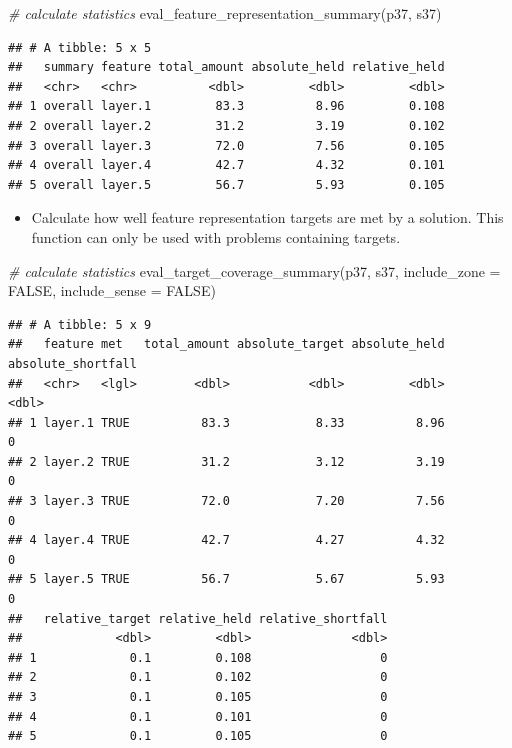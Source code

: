 \documentclass[
  12pt,
]{book}
\newenvironment{Shaded}{\begin{snugshade}}{\end{snugshade}}
\newcommand{\AttributeTok}[1]{\textcolor[rgb]{0.77,0.63,0.00}{#1}}
\newcommand{\CommentTok}[1]{\textcolor[rgb]{0.56,0.35,0.01}{\textit{#1}}}
\newcommand{\ConstantTok}[1]{\textcolor[rgb]{0.00,0.00,0.00}{#1}}
\newcommand{\FunctionTok}[1]{\textcolor[rgb]{0.00,0.00,0.00}{#1}}
\newcommand{\NormalTok}[1]{#1}
\providecommand{\tightlist}{%
  \setlength{\itemsep}{0pt}\setlength{\parskip}{0pt}}
\begin{document}
\begin{Shaded}
\begin{Highlighting}[]
\CommentTok{\# calculate statistics}
\FunctionTok{eval\_feature\_representation\_summary}\NormalTok{(p37, s37)}
\end{Highlighting}
\end{Shaded}

\begin{verbatim}
## # A tibble: 5 x 5
##   summary feature total_amount absolute_held relative_held
##   <chr>   <chr>          <dbl>         <dbl>         <dbl>
## 1 overall layer.1         83.3          8.96         0.108
## 2 overall layer.2         31.2          3.19         0.102
## 3 overall layer.3         72.0          7.56         0.105
## 4 overall layer.4         42.7          4.32         0.101
## 5 overall layer.5         56.7          5.93         0.105
\end{verbatim}

\begin{itemize}
\tightlist
\item
  Calculate how well feature representation targets are met by a solution. This function can only be used with problems containing targets.
\end{itemize}

\begin{Shaded}
\begin{Highlighting}[]
\CommentTok{\# calculate statistics}
\FunctionTok{eval\_target\_coverage\_summary}\NormalTok{(p37, s37, }\AttributeTok{include\_zone =} \ConstantTok{FALSE}\NormalTok{, }\AttributeTok{include\_sense =} \ConstantTok{FALSE}\NormalTok{)}
\end{Highlighting}
\end{Shaded}

\begin{verbatim}
## # A tibble: 5 x 9
##   feature met   total_amount absolute_target absolute_held absolute_shortfall
##   <chr>   <lgl>        <dbl>           <dbl>         <dbl>              <dbl>
## 1 layer.1 TRUE          83.3            8.33          8.96                  0
## 2 layer.2 TRUE          31.2            3.12          3.19                  0
## 3 layer.3 TRUE          72.0            7.20          7.56                  0
## 4 layer.4 TRUE          42.7            4.27          4.32                  0
## 5 layer.5 TRUE          56.7            5.67          5.93                  0
##   relative_target relative_held relative_shortfall
##             <dbl>         <dbl>              <dbl>
## 1             0.1         0.108                  0
## 2             0.1         0.102                  0
## 3             0.1         0.105                  0
## 4             0.1         0.101                  0
## 5             0.1         0.105                  0
\end{verbatim}
\end{document}
